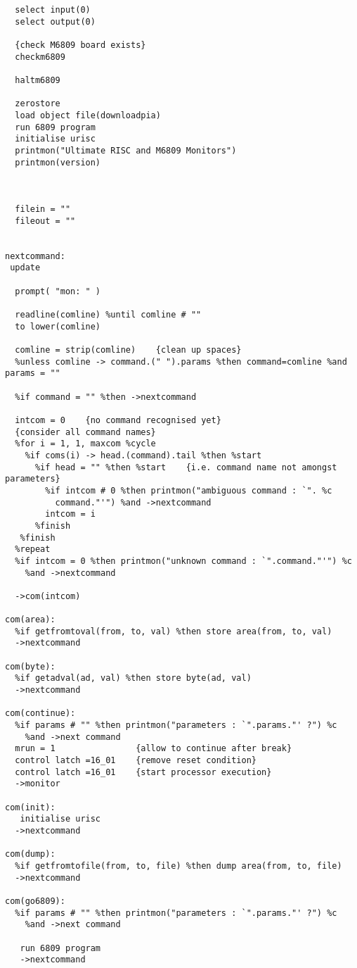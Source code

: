 \begin{verbatim}
  select input(0)
  select output(0)

  {check M6809 board exists}
  checkm6809

  haltm6809

  zerostore
  load object file(downloadpia)
  run 6809 program
  initialise urisc
  printmon("Ultimate RISC and M6809 Monitors")
  printmon(version)

  

  filein = ""
  fileout = ""


nextcommand:
 update

  prompt( "mon: " )

  readline(comline) %until comline # ""
  to lower(comline)

  comline = strip(comline)    {clean up spaces}
  %unless comline -> command.(" ").params %then command=comline %and params = ""

  %if command = "" %then ->nextcommand

  intcom = 0    {no command recognised yet}
  {consider all command names}
  %for i = 1, 1, maxcom %cycle
    %if coms(i) -> head.(command).tail %then %start
      %if head = "" %then %start    {i.e. command name not amongst parameters}
        %if intcom # 0 %then printmon("ambiguous command : `". %c
          command."'") %and ->nextcommand
        intcom = i
      %finish
   %finish
  %repeat
  %if intcom = 0 %then printmon("unknown command : `".command."'") %c
    %and ->nextcommand

  ->com(intcom)

com(area):
  %if getfromtoval(from, to, val) %then store area(from, to, val)
  ->nextcommand

com(byte):
  %if getadval(ad, val) %then store byte(ad, val)
  ->nextcommand

com(continue):
  %if params # "" %then printmon("parameters : `".params."' ?") %c
    %and ->next command
  mrun = 1                {allow to continue after break}
  control latch =16_01    {remove reset condition}
  control latch =16_01    {start processor execution}
  ->monitor

com(init):
   initialise urisc
  ->nextcommand

com(dump):
  %if getfromtofile(from, to, file) %then dump area(from, to, file)
  ->nextcommand

com(go6809):
  %if params # "" %then printmon("parameters : `".params."' ?") %c
    %and ->next command
  
   run 6809 program
   ->nextcommand


\end{verbatim}
